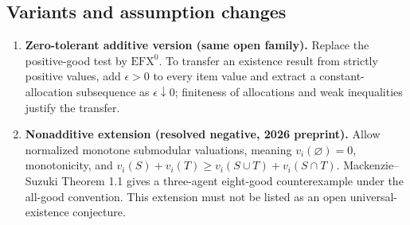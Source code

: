 \documentclass[11pt,a4paper]{article}
\begin{document}
\subsection*{Variants and assumption changes}
\begin{enumerate}
\item \textbf{Zero-tolerant additive version (same open family).} Replace the positive-good test by \(\mathrm{EFX}^{0}\). To transfer an existence result from strictly positive values, add \(\epsilon>0\) to every item value and extract a constant-allocation subsequence as \(\epsilon\downarrow0\); finiteness of allocations and weak inequalities justify the transfer.
\item \textbf{Nonadditive extension (resolved negative, 2026 preprint).} Allow normalized monotone submodular valuations, meaning \(v_i(\varnothing)=0\), monotonicity, and \(v_i(S)+v_i(T)\ge v_i(S\cup T)+v_i(S\cap T)\). Mackenzie--Suzuki Theorem 1.1 gives a three-agent eight-good counterexample under the all-good convention. This extension must not be listed as an open universal-existence conjecture.
\end{enumerate}
\end{document}
